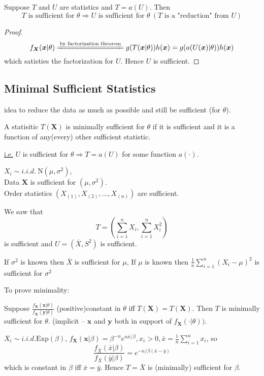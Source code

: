 \documentclass[english, 11pt]{article}
\begin{document}
\begin{thrm}
Suppose $T$ and $U$ are statistics and $T=a(U)$. Then 
$$
 T \text{ is sufficient for }\theta\Rightarrow U \text{ is sufficient for }\theta~(T \text{ is a "reduction" from } U)
$$
\end{thrm}
\begin{proof}
$$
f_{\bm{X}}(\bm{x}|\theta)\xlongequal{\text{by factorization theorem}}g(T(\bm{x}|\theta))h(\bm{x})=g(a(U(\bm{x})|\theta))h(\bm{x})
$$
which satisties the factorization for $U$. Hence $U$ is sufficient.
\end{proof}

\subsection{Minimal Sufficient Statistics}

idea to reduce the data as much as possible and still be sufficient (for $\theta$).
\begin{defn}\label{defn:214}
A statisitic $T(\bm{X})$ is minimally sufficient for $\theta$ if it is sufficient and it is a function of any(every) other sufficient statistic.
\end{defn}
\underline{i.e.} $U$ is sufficient for $\theta\Rightarrow T=a(U)$ for some function $a(\cdot)$.

\begin{exmp}
$X_i\sim i.i.d.~\text{N}(\mu, \sigma^2)$, \\
Data $\bm{X}$ is sufficient for $(\mu, \sigma^2)$.\\
Order statistics $(X_{(1)}, X_{(2)}, \dots,X_{(n)})$ are sufficient.
\end{exmp}

We saw that 
$$
T=\left(\sum_{i=1}^nX_i, \sum_{i=1}^nX_i^2\right)
$$
is sufficient and $U=(\bar{X},S^2)$ is sufficient.
\begin{note}
If $\sigma^2$ is known then $\bar{X}$ is sufficient for $\mu$, If $\mu$ is known then $\frac{1}{n}\sum_{i=1}^n(X_i-\mu)^2$ is sufficient for $\sigma^2$
\end{note}

To prove minimality:
\begin{thrm}\label{thrm:215}
Suppose $\frac{f_{\bm{X}}(\bm{x}|\theta)}{f_{\bm{X}}(\bm{y}|\theta)}$ (positive)constant in $\theta$ iff $T(\bm{X})=T(\bm{X})$. Then $T$ is minimally sufficient for $\theta$. (implicit -- $\bm{x}$ and $\bm{y}$ both in support of $f_{\bm{X}}(\cdot|\theta))$.
\end{thrm}
\begin{exmp}
$X_i\sim i.i.d. \text{Exp}(\beta)$, $f_{\bm{X}}(\bm{x}|\beta)=\beta^{-n}e^{n\bar{x}/\beta}, x_i>0, \bar{x}=\frac{1}{n}\sum_{i=1}^nx_i$, so
$$
\frac{f_{\bar{X}}(\bar{x}|\beta)}{f_{\bar{X}}(\bar{y}|\beta)}=e^{-n/\beta(\bar{x}-\bar{y})}
$$
which is constant in $\beta$ iff $\bar{x}=\bar{y}$. Hence $T=\bar{X}$ is (minimally) sufficient for $\beta$.
\end{exmp}
\end{document}
